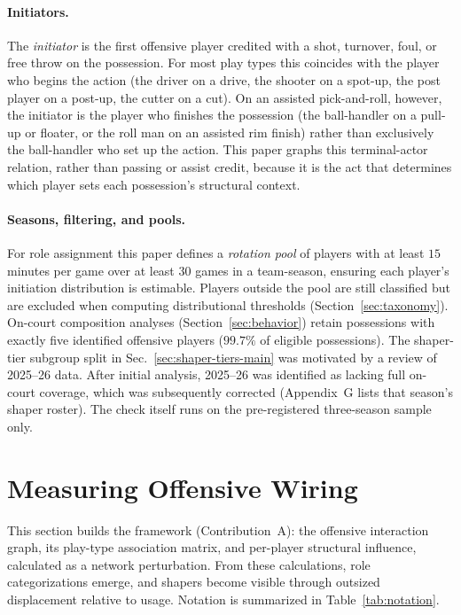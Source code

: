 \documentclass[11pt]{article}
\begin{document}
\paragraph{Initiators.}
The \emph{initiator} is the first offensive player credited with a shot, turnover, foul,
or free throw on the possession. For most play types this coincides with the player who
begins the action (the driver on a drive, the shooter on a spot-up, the post player on a
post-up, the cutter on a cut). On an assisted pick-and-roll, however, the initiator is the
player who finishes the possession (the ball-handler on a pull-up or floater, or the roll
man on an assisted rim finish) rather than exclusively the ball-handler who set up the
action. This paper graphs this terminal-actor relation, rather than passing or assist credit,
because it is the act that determines which player sets each possession's structural context.

\paragraph{Seasons, filtering, and pools.}
For role assignment this paper defines a \emph{rotation pool} of players with at least $15$
minutes per game over at least $30$ games in a team-season, ensuring each player's initiation
distribution is estimable. Players outside the pool are still classified but are excluded when
computing distributional thresholds (Section~\ref{sec:taxonomy}). On-court composition analyses
(Section~\ref{sec:behavior}) retain possessions with exactly five identified offensive players
($99.7\%$ of eligible possessions). The shaper-tier subgroup split in
Sec.~\ref{sec:shaper-tiers-main} was motivated by a review of 2025--26 data. After initial
analysis, 2025--26 was identified as lacking full on-court coverage, which was subsequently
corrected (Appendix~G lists that season's shaper roster). The check itself runs on the
pre-registered three-season sample only.

\section{Measuring Offensive Wiring}
\label{sec:framework}

This section builds the framework (Contribution~A): the offensive interaction graph, its
play-type association matrix, and per-player structural influence, calculated as a network
perturbation. From these calculations, role categorizations emerge, and shapers become
visible through outsized displacement relative to usage. Notation is summarized in
Table~\ref{tab:notation}.
\end{document}
